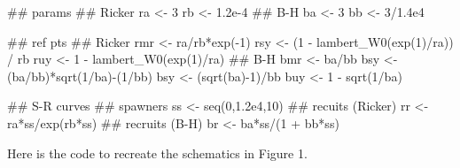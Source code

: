\documentclass[11pt,]{article}
\newenvironment{Shaded}{}{}
\newcommand{\CommentTok}[1]{\textcolor[rgb]{0.00,0.50,0.00}{#1}}
\newcommand{\DecValTok}[1]{#1}
\newcommand{\FloatTok}[1]{#1}
\newcommand{\KeywordTok}[1]{\textcolor[rgb]{0.00,0.00,1.00}{#1}}
\newcommand{\NormalTok}[1]{#1}
\newcommand{\OperatorTok}[1]{#1}
\newcommand{\StringTok}[1]{\textcolor[rgb]{0.00,0.50,0.50}{#1}}
\begin{document}
\begin{Shaded}
\begin{Highlighting}[]
\CommentTok{## params}
\CommentTok{## Ricker}
\NormalTok{ra <-}\StringTok{ }\DecValTok{3}
\NormalTok{rb <-}\StringTok{ }\FloatTok{1.2e-4}
\CommentTok{## B-H}
\NormalTok{ba <-}\StringTok{ }\DecValTok{3}
\NormalTok{bb <-}\StringTok{ }\DecValTok{3}\OperatorTok{/}\FloatTok{1.4e4}

\CommentTok{## ref pts}
\CommentTok{## Ricker}
\NormalTok{rmr <-}\StringTok{ }\NormalTok{ra}\OperatorTok{/}\NormalTok{rb}\OperatorTok{*}\KeywordTok{exp}\NormalTok{(}\OperatorTok{-}\DecValTok{1}\NormalTok{)}
\NormalTok{rsy <-}\StringTok{ }\NormalTok{(}\DecValTok{1} \OperatorTok{-}\StringTok{ }\KeywordTok{lambert_W0}\NormalTok{(}\KeywordTok{exp}\NormalTok{(}\DecValTok{1}\NormalTok{)}\OperatorTok{/}\NormalTok{ra)) }\OperatorTok{/}\StringTok{ }\NormalTok{rb}
\NormalTok{ruy <-}\StringTok{ }\DecValTok{1} \OperatorTok{-}\StringTok{ }\KeywordTok{lambert_W0}\NormalTok{(}\KeywordTok{exp}\NormalTok{(}\DecValTok{1}\NormalTok{)}\OperatorTok{/}\NormalTok{ra)}
\CommentTok{## B-H}
\NormalTok{bmr <-}\StringTok{ }\NormalTok{ba}\OperatorTok{/}\NormalTok{bb}
\NormalTok{bsy <-}\StringTok{ }\NormalTok{(ba}\OperatorTok{/}\NormalTok{bb)}\OperatorTok{*}\KeywordTok{sqrt}\NormalTok{(}\DecValTok{1}\OperatorTok{/}\NormalTok{ba)}\OperatorTok{-}\NormalTok{(}\DecValTok{1}\OperatorTok{/}\NormalTok{bb)}
\NormalTok{bsy <-}\StringTok{ }\NormalTok{(}\KeywordTok{sqrt}\NormalTok{(ba)}\OperatorTok{-}\DecValTok{1}\NormalTok{)}\OperatorTok{/}\NormalTok{bb}
\NormalTok{buy <-}\StringTok{ }\DecValTok{1} \OperatorTok{-}\StringTok{ }\KeywordTok{sqrt}\NormalTok{(}\DecValTok{1}\OperatorTok{/}\NormalTok{ba)}

\CommentTok{## S-R curves}
\CommentTok{## spawners}
\NormalTok{ss <-}\StringTok{ }\KeywordTok{seq}\NormalTok{(}\DecValTok{0}\NormalTok{,}\FloatTok{1.2e4}\NormalTok{,}\DecValTok{10}\NormalTok{)}
\CommentTok{## recuits (Ricker)}
\NormalTok{rr <-}\StringTok{ }\NormalTok{ra}\OperatorTok{*}\NormalTok{ss}\OperatorTok{/}\KeywordTok{exp}\NormalTok{(rb}\OperatorTok{*}\NormalTok{ss)}
\CommentTok{## recruits (B-H)}
\NormalTok{br <-}\StringTok{ }\NormalTok{ba}\OperatorTok{*}\NormalTok{ss}\OperatorTok{/}\NormalTok{(}\DecValTok{1} \OperatorTok{+}\StringTok{ }\NormalTok{bb}\OperatorTok{*}\NormalTok{ss)}
\end{Highlighting}
\end{Shaded}

Here is the code to recreate the schematics in Figure 1.
\end{document}
